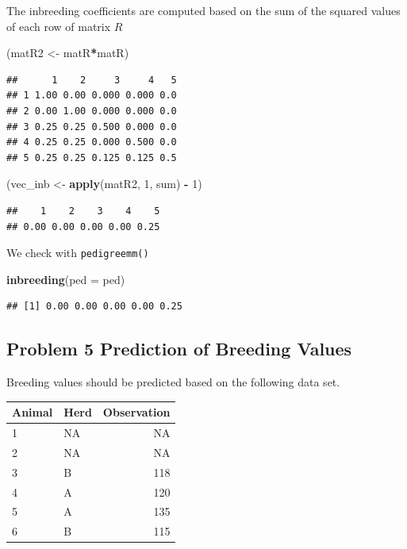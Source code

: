 \documentclass[]{article}
\newenvironment{Shaded}{\begin{snugshade}}{\end{snugshade}}
\newcommand{\KeywordTok}[1]{\textcolor[rgb]{0.13,0.29,0.53}{\textbf{#1}}}
\newcommand{\DataTypeTok}[1]{\textcolor[rgb]{0.13,0.29,0.53}{#1}}
\newcommand{\DecValTok}[1]{\textcolor[rgb]{0.00,0.00,0.81}{#1}}
\newcommand{\StringTok}[1]{\textcolor[rgb]{0.31,0.60,0.02}{#1}}
\newcommand{\OperatorTok}[1]{\textcolor[rgb]{0.81,0.36,0.00}{\textbf{#1}}}
\newcommand{\NormalTok}[1]{#1}
\begin{document}
The inbreeding coefficients are computed based on the sum of the squared
values of each row of matrix \(R\)

\begin{Shaded}
\begin{Highlighting}[]
\NormalTok{(matR2 <-}\StringTok{ }\NormalTok{matR}\OperatorTok{*}\NormalTok{matR)}
\end{Highlighting}
\end{Shaded}

\begin{verbatim}
##      1    2     3     4   5
## 1 1.00 0.00 0.000 0.000 0.0
## 2 0.00 1.00 0.000 0.000 0.0
## 3 0.25 0.25 0.500 0.000 0.0
## 4 0.25 0.25 0.000 0.500 0.0
## 5 0.25 0.25 0.125 0.125 0.5
\end{verbatim}

\begin{Shaded}
\begin{Highlighting}[]
\NormalTok{(vec_inb <-}\StringTok{ }\KeywordTok{apply}\NormalTok{(matR2, }\DecValTok{1}\NormalTok{, sum) }\OperatorTok{-}\StringTok{ }\DecValTok{1}\NormalTok{)}
\end{Highlighting}
\end{Shaded}

\begin{verbatim}
##    1    2    3    4    5 
## 0.00 0.00 0.00 0.00 0.25
\end{verbatim}

We check with \texttt{pedigreemm()}

\begin{Shaded}
\begin{Highlighting}[]
\KeywordTok{inbreeding}\NormalTok{(}\DataTypeTok{ped =}\NormalTok{ ped)}
\end{Highlighting}
\end{Shaded}

\begin{verbatim}
## [1] 0.00 0.00 0.00 0.00 0.25
\end{verbatim}

\clearpage
\pagebreak

\subsection{Problem 5 Prediction of Breeding
Values}\label{problem-5-prediction-of-breeding-values}

Breeding values should be predicted based on the following data set.

\begin{longtable}[]{@{}llr@{}}
\toprule
Animal & Herd & Observation\tabularnewline
\midrule
\endhead
1 & NA & NA\tabularnewline
2 & NA & NA\tabularnewline
3 & B & 118\tabularnewline
4 & A & 120\tabularnewline
5 & A & 135\tabularnewline
6 & B & 115\tabularnewline
\bottomrule
\end{longtable}
\end{document}
